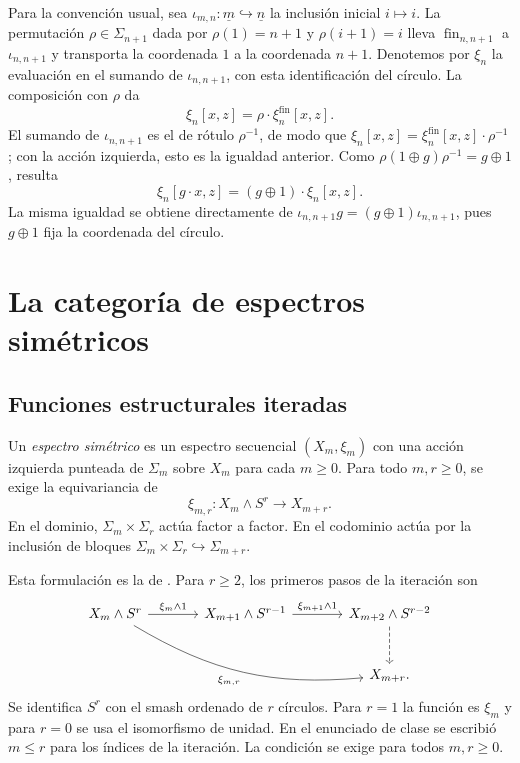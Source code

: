 Para la convención usual, sea $\iota_{m,n}\colon\underline m\hookrightarrow\underline n$ la inclusión inicial $i\mapsto i$. La permutación $\rho\in\Sigma_{n+1}$ dada por $\rho(1)=n+1$ y $\rho(i+1)=i$ lleva $\operatorname{fin}_{n,n+1}$ a $\iota_{n,n+1}$ y transporta la coordenada $1$ a la coordenada $n+1$. Denotemos por $\xi_n$ la evaluación en el sumando de $\iota_{n,n+1}$, con esta identificación del círculo. La composición con $\rho$ da
\[
\xi_n[x,z]=\rho\cdot\xi_n^{\mathrm{fin}}[x,z].
\]
El sumando de $\iota_{n,n+1}$ es el de rótulo $\rho^{-1}$, de modo que
$\xi_n[x,z]=\xi_n^{\mathrm{fin}}[x,z]\cdot\rho^{-1}$; con la acción izquierda, esto es la
igualdad anterior. Como $\rho(1\oplus g)\rho^{-1}=g\oplus1$, resulta
\[
\xi_n[g\cdot x,z]=(g\oplus1)\cdot\xi_n[x,z].
\]
La misma igualdad se obtiene directamente de $\iota_{n,n+1}g=(g\oplus1)\iota_{n,n+1}$, pues $g\oplus1$ fija la coordenada del círculo.

\section{La categoría de espectros simétricos}

\subsection{Funciones estructurales iteradas}

\begin{defi}\label{defi:c27-espectro-simetrico}
Un \emph{espectro simétrico} es un espectro secuencial $(X_m,\xi_m)$ con una acción izquierda punteada de $\Sigma_m$ sobre $X_m$ para cada $m\geq 0$. Para todo $m,r\geq 0$, se exige la equivariancia de
\[
\xi_{m,r}\colon X_m\wedge S^r\longrightarrow X_{m+r}.
\]
En el dominio, $\Sigma_m\times\Sigma_r$ actúa factor a factor. En el codominio actúa por la inclusión de bloques
$\Sigma_m\times\Sigma_r\hookrightarrow\Sigma_{m+r}$.
\end{defi}

Esta formulación es la de \cite[definición~6.1.2]{malkiewich}. Para $r\geq2$, los primeros pasos de la iteración son
\[
\begin{tikzcd}[column sep=large,row sep=large]
X_m\wedge S^r
  \arrow[r,"\xi_m\wedge1"]\arrow[drr,"\xi_{m,r}"',bend right=18]&
X_{m+1}\wedge S^{r-1}\arrow[r,"\xi_{m+1}\wedge1"]&
X_{m+2}\wedge S^{r-2}\arrow[d,dashed]\\
&&X_{m+r}.
\end{tikzcd}
\]
Se identifica $S^r$ con el smash ordenado de $r$ círculos. Para $r=1$ la función es $\xi_m$ y para $r=0$ se usa el isomorfismo de unidad. En el enunciado de clase se escribió $m\leq r$ para los índices de la iteración. La condición se exige para todos $m,r\geq0$.


